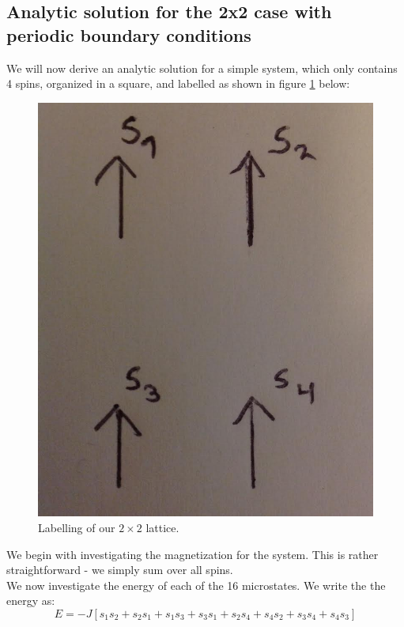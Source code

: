 \documentclass[a4paper, 10pt]{article}
\begin{document}
\subsection{Analytic solution for the 2x2 case with periodic boundary conditions}\label{2x2analytic}
We will now derive an analytic solution for a simple system, which only contains 4 spins, organized in a square, and labelled as shown in figure \ref{fig:2x2spins} below:
\begin{figure}[!ht]
\centering
\includegraphics[scale=0.2]{SpinSystem.jpeg}
\caption{Labelling of our $2 \times 2$ lattice.}\label{fig:2x2spins}
\end{figure}
We begin with investigating the magnetization for the system. This is rather straightforward - we simply sum over all spins.\\
\linebreak
We now investigate the energy of each of the 16 microstates. We write the the energy as:
$$E=-J\left[s_1s_2+s_2s_1+s_1s_3+s_3s_1+s_2s_4+s_4s_2+s_3s_4+s_4s_3\right]$$
\end{document}
